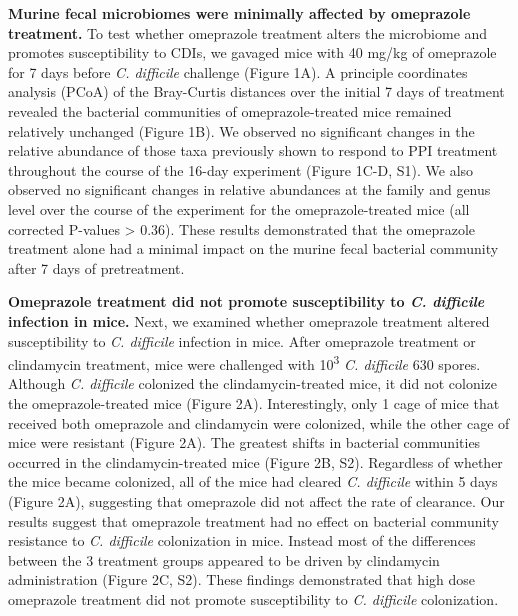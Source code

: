 \documentclass[11pt,]{article}
\begin{document}
\textbf{Murine fecal microbiomes were minimally affected by omeprazole
treatment. } To test whether omeprazole treatment alters the microbiome
and promotes susceptibility to CDIs, we gavaged mice with 40 mg/kg of
omeprazole for 7 days before \emph{C. difficile} challenge (Figure 1A).
A principle coordinates analysis (PCoA) of the Bray-Curtis distances
over the initial 7 days of treatment revealed the bacterial communities
of omeprazole-treated mice remained relatively unchanged (Figure 1B). We
observed no significant changes in the relative abundance of those taxa
previously shown to respond to PPI treatment throughout the course of
the 16-day experiment (Figure 1C-D, S1). We also observed no significant
changes in relative abundances at the family and genus level over the
course of the experiment for the omeprazole-treated mice (all corrected
P-values \textgreater{} 0.36). These results demonstrated that the
omeprazole treatment alone had a minimal impact on the murine fecal
bacterial community after 7 days of pretreatment.

\textbf{Omeprazole treatment did not promote susceptibility to \emph{C.
difficile} infection in mice.} Next, we examined whether omeprazole
treatment altered susceptibility to \emph{C. difficile} infection in
mice. After omeprazole treatment or clindamycin treatment, mice were
challenged with 10\textsuperscript{3} \emph{C. difficile} 630 spores.
Although \emph{C. difficile} colonized the clindamycin-treated mice, it
did not colonize the omeprazole-treated mice (Figure 2A). Interestingly,
only 1 cage of mice that received both omeprazole and clindamycin were
colonized, while the other cage of mice were resistant (Figure 2A). The
greatest shifts in bacterial communities occurred in the
clindamycin-treated mice (Figure 2B, S2). Regardless of whether the mice
became colonized, all of the mice had cleared \emph{C. difficile} within
5 days (Figure 2A), suggesting that omeprazole did not affect the rate
of clearance. Our results suggest that omeprazole treatment had no
effect on bacterial community resistance to \emph{C. difficile}
colonization in mice. Instead most of the differences between the 3
treatment groups appeared to be driven by clindamycin administration
(Figure 2C, S2). These findings demonstrated that high dose omeprazole
treatment did not promote susceptibility to \emph{C. difficile}
colonization.
\end{document}
